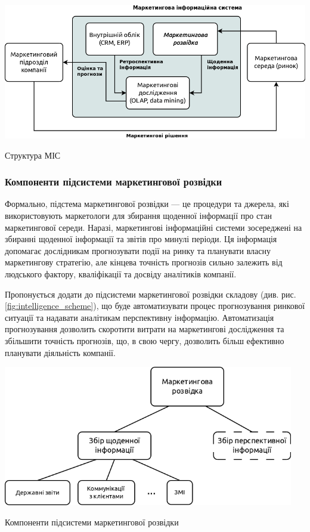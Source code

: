             \begin{stdfigure}
                \includegraphics[width=7in]{images/mis_structure.png}
                \caption{Структура МІС}
                \label{fig:mis_structure}
            \end{stdfigure}    

        \subsubsection{Компоненти підсистеми маркетингової розвідки}
Формально, підстема маркетингової розвідки --- це процедури та джерела, які використовують маркетологи для збирання щоденної інформації про стан маркетингової середи\cite{kotler14}. Наразі, маркетингові інформаційні системи зосереджені на збиранні щоденної інформації та звітів про минулі періоди. Ця інформація допомагає дослідникам прогнозувати події на ринку та планувати власну маркетингову стратегію, але кінцева точність прогнозів сильно залежить від людського фактору, кваліфікації та досвіду аналітиків компанії.
 
Пропонується додати до підсистеми маркетингової розвідки складову (див. рис. \ref{fig:intelligence_scheme}), що буде автоматизувати процес прогнозування ринкової ситуації та надавати аналітикам перспективну інформацію. Автоматизація прогнозування дозволить скоротити витрати на маркетингові дослідження та збільшити точність прогнозів, що, в свою чергу, дозволить більш ефективно планувати діяльність компанії.

            \begin{stdfigure}
                \includegraphics[width=5in]{images/intelligence_scheme.png}
                \caption{Компоненти підсистеми маркетингової розвідки}
                \label{fig:intelligence_scheme}
            \end{stdfigure}    
  
